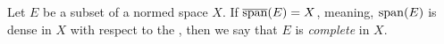 \documentclass[../thesis.tex]{subfiles}
\begin{document}
\begin{definition}[Complete]\label{def:complete}  %
    Let $E$ be a subset of a normed space $X$. If $\overline{\operatorname{span}}(E) = X$, meaning, $\operatorname{span}(E)$ is dense in $X$ with respect to the \GenNormX, then we say that $E$ is \emph{complete} in $X$.  %
\end{definition}
\end{document}
